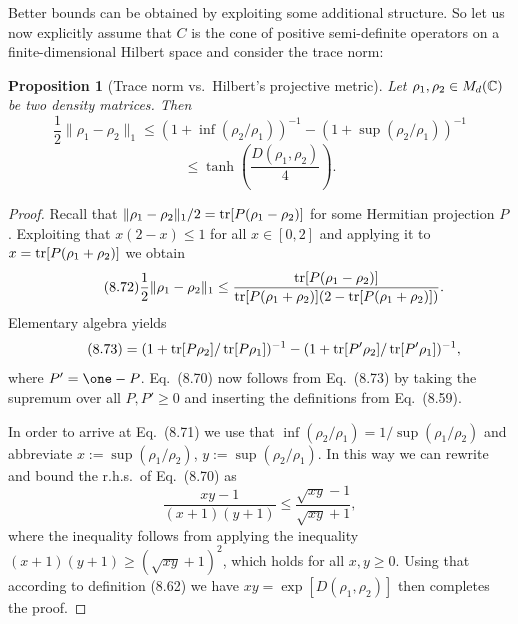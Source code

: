 \documentclass[11pt,a4paper]{article}
\theoremstyle{plain}
\newtheorem{proposition}{Proposition}[section]
\theoremstyle{definition}
\theoremstyle{remark}
\begin{document}
Better bounds can be obtained by exploiting some additional structure. So let us now explicitly assume that $C$ is the cone of positive semi-definite
operators on a finite-dimensional Hilbert space and consider the trace norm:

\begin{proposition}[Trace norm vs.\ Hilbert's projective metric]
    Let $\rho_1,\rho_2\in M_d(\mathbb{C})$ be two density matrices. Then
    \begin{equation}\tag{8.70}
        \frac{1}{2}\|\rho_1-\rho_2\|_1
        \le (1+\inf(\rho_2/\rho_1))^{-1} - (1+\sup(\rho_2/\rho_1))^{-1}
    \end{equation}
    \begin{equation}\tag{8.71}
        \le \tanh\!\left(\frac{D(\rho_1,\rho_2)}{4}\right).
    \end{equation}
\end{proposition}

\begin{proof}
    Recall that $\|\rho_1-\rho_2\|_1/2 = \operatorname{tr}[P(\rho_1-\rho_2)]$ for some Hermitian projection $P$.
    Exploiting that $x(2-x)\le 1$ for all $x\in[0,2]$ and applying it to $x=\operatorname{tr}[P(\rho_1+\rho_2)]$ we obtain
    \begin{equation}\tag{8.72}
        \frac{1}{2}\|\rho_1-\rho_2\|_1 \le
        \frac{\operatorname{tr}[P(\rho_1-\rho_2)]}{\operatorname{tr}[P(\rho_1+\rho_2)](2-\operatorname{tr}[P(\rho_1+\rho_2)])}.
    \end{equation}
    Elementary algebra yields
    \begin{equation}\tag{8.73}
        =
        (1+\operatorname{tr}[P\rho_2]/\operatorname{tr}[P\rho_1])^{-1}
        -
        (1+\operatorname{tr}[P'\rho_2]/\operatorname{tr}[P'\rho_1])^{-1},
    \end{equation}
    where $P'=\one-P$. Eq.~(8.70) now follows from Eq.~(8.73) by taking the supremum over all $P,P'\ge 0$ and inserting the definitions from Eq.~(8.59).

    In order to arrive at Eq.~(8.71) we use that $\inf(\rho_2/\rho_1)=1/\sup(\rho_1/\rho_2)$ and abbreviate $x:=\sup(\rho_1/\rho_2)$, $y:=\sup(\rho_2/\rho_1)$.
    In this way we can rewrite and bound the r.h.s.\ of Eq.~(8.70) as
    \begin{equation}\tag{8.74}
        \frac{xy-1}{(x+1)(y+1)} \le \frac{\sqrt{xy}-1}{\sqrt{xy}+1},
    \end{equation}
    where the inequality follows from applying the inequality $(x+1)(y+1)\ge (\sqrt{xy}+1)^2$, which holds for all $x,y\ge 0$.
    Using that according to definition (8.62) we have $xy=\exp[D(\rho_1,\rho_2)]$ then completes the proof.
\end{proof}
\end{document}
